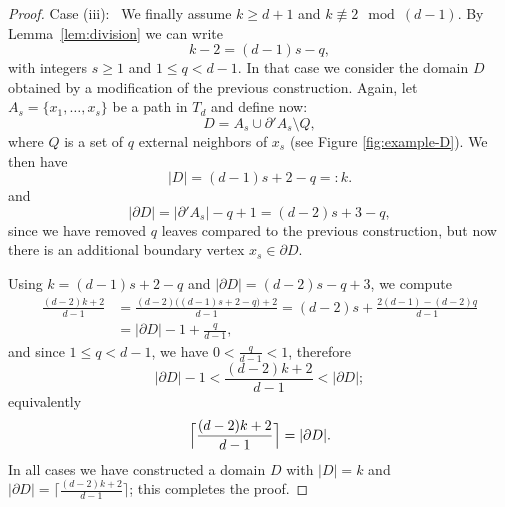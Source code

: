 \documentclass[a4paper, 11pt]{article}
\numberwithin{equation}{section}
\theoremstyle{definition}
\theoremstyle{remark}
\begin{document}
\begin{proof}
\medskip 

Case (iii): \  We finally  assume  $k\geq d+1$ and  $k \not\equiv 2  \mod (d-1)$. By Lemma~\ref{lem:division} we can write
\begin{equation}\label{eq.k-division}
   k-2 = (d-1)s - q,
\end{equation}
with integers $s\ge 1$ and $1\le q<d-1$. 
In that case we consider the domain $D$ obtained by a modification of the previous construction. Again, let 
$A_s = \{x_1,\dots,x_s\}$ be a  path in $T_d$ and define now:
$$
 D = A_s\cup \partial' A_s\setminus Q,
$$
 where 
$Q$ is a set of $q$ external neighbors of $x_s$ (see Figure \ref{fig:example-D}). We then have
$$
   |D|    =  (d-1)s  + 2 - q   =:k.
$$
and
$$
   |\partial D| = |\partial'A_s| -q +1 =  (d-2)s + 3-q,
$$
since we have removed $q$ leaves compared to the previous construction, but now there is an additional boundary vertex  $x_s \in \partial D$. 

\smallskip 

Using  $k = (d-1)s +2- q$ and  $|\partial D| = (d-2)s - q + 3$,  we compute
\begin{align*}
 \frac{(d-2)k+2}{d-1} &=\frac{(d-2)\bigl((d-1)s+2-q\bigr)+2}{d-1} =(d-2)s+\frac{2(d-1)-(d-2)q}{d-1}
\\ &=  |\partial D| -1+\frac{q}{d-1},
\end{align*}
and since $1\le q<d-1$, we have $0< \frac{q}{d-1}<1$, therefore 
\[
   |\partial D| - 1  < \frac{(d-2)k+2}{d-1}  < |\partial D|;
\]
equivalently 
\[
   \Bigl\lceil \frac{(d-2)k+2}{d-1}\Bigr\rceil  = |\partial D|.
\]
In all cases we have constructed a domain $D$ with $|D|=k$ and $|\partial D| = \bigl\lceil \frac{(d-2)k+2}{d-1}\bigr\rceil$;  this completes the proof.
\end{proof}
 

\medskip 
\end{document}
